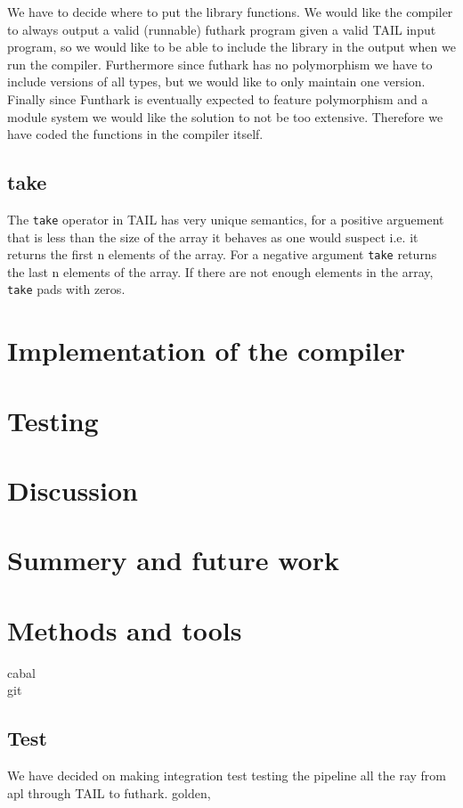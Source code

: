 \documentclass[11pt]{article}
\begin{document}
We have to decide where to put the library functions.
We would like the compiler to always output a valid (runnable) futhark program given a valid TAIL input program, so we would like to
be able to include the library in the output when we run the compiler.
Furthermore since futhark has no polymorphism we have to include versions of all types, but we would like to only maintain one version.
Finally since Funthark is eventually expected to feature polymorphism and a module system we would like the solution to not be too
extensive. Therefore we have coded the functions in the compiler itself.

\subsection{take}

The {\tt take} operator in TAIL has very unique semantics, for a positive arguement that is less than the size of the array it behaves as one would suspect i.e. it returns the first n elements of the array. For a negative argument {\tt take} returns the last n elements of the array. If there are not enough elements in the array, {\tt take} pads with zeros. 

\section{Implementation of the compiler}

\section{Testing}

\section{Discussion}

\section{Summery and future work}

\section{Methods and tools}

cabal\\
git\\
\subsection{Test}
We have decided on making integration test testing the pipeline all the ray from apl through TAIL to futhark.
golden, \\
\end{document}
